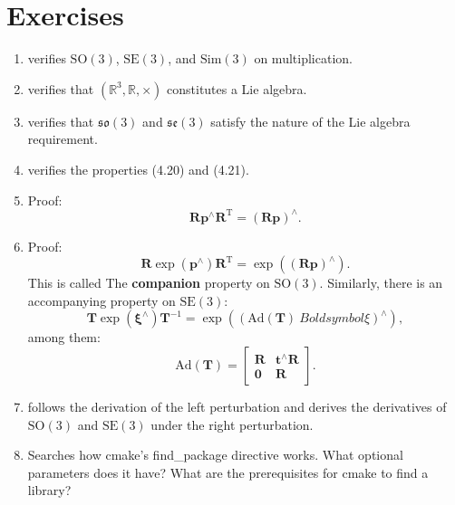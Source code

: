 \section*{ Exercises}
\begin{enumerate}
	\item verifies $\mathrm{SO}(3)$, $\mathrm{SE}(3)$, and $\mathrm{Sim}(3)$ on multiplication.
	\item verifies that $( \mathbb{R}^3, \mathbb{R}, \times )$ constitutes a Lie algebra.
	\item verifies that $\mathfrak{so}(3)$ and $\mathfrak{se}(3)$ satisfy the nature of the Lie algebra requirement.
	\item verifies the properties (4.20) and (4.21).
	\item Proof: \[
	\bm{R} \bm{p}^\wedge \bm{R}^\mathrm{T} = (\bm{Rp})^\wedge .\]
	\item Proof: \[
	\bm{R} \exp( \bm{p}^\wedge) \bm{R}^\mathrm{T} = \exp( (\bm{Rp})^\wedge ).\] This is called The \textbf{companion} property on $\mathrm{SO}(3)$. Similarly, there is an accompanying property on $\mathrm{SE}(3)$:
	\begin{equation}
	\bm{T} \exp(\boldsymbol{\xi}^\wedge)\bm{T}^{-1} = \exp \left( \left( \mathrm{Ad}(\bm{T}) \ Boldsymbol{\xi} \right) ^\wedge \right),
	\end{equation}
	among them:
	\begin{equation}
	\label{eq:adjSE3}
	\mathrm{Ad} ( \bm{T} ) = \left[ {\begin{array}{*{20}{c}}
		\bm{R} &{{ \bm{t} ^ \wedge } \bm{R} }\\
		\bm{0} & \bm{R}
		\end{array}} \right]. 
	\end{equation}
	\item follows the derivation of the left perturbation and derives the derivatives of $\mathrm{SO}(3)$ and $\mathrm{SE}(3)$ under the right perturbation.
	\item Searches how cmake's find\_package directive works. What optional parameters does it have? What are the prerequisites for cmake to find a library?
\end{enumerate}